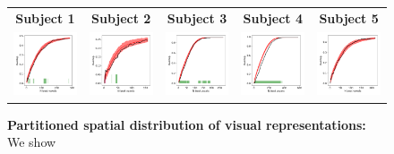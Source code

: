 \begin{figure}[ht]
\scriptsize
\vspace{2ex}
\hspace{-4ex}
\begin{tabular}{ccccc}
\textbf{\Large Subject 1} & \textbf{\Large Subject 2} & \textbf{\Large Subject 3} & \textbf{\Large Subject 4} & \textbf{\Large Subject 5}\\
{\includegraphics[width=.19\linewidth]{figures/part_II/locality_test_01.png}}
\hspace{0ex}
&{\includegraphics[width=.19\linewidth]{figures/part_II/locality_test_03.png}}
\hspace{0ex}
&{\includegraphics[width=.19\linewidth]{figures/part_II/locality_test_04.png}}
\hspace{0ex}
&{\includegraphics[width=.19\linewidth]{figures/part_II/locality_test_05.png}}
\hspace{0ex}
&{\includegraphics[width=.19\linewidth]{figures/part_II/locality_test_06.png}}
\hspace{-1ex} \\
\end{tabular}
\vspace{3ex}
\caption{\textbf{Partitioned spatial distribution of visual representations:} We show }
\label{fig:visual_locality}
\end{figure}


